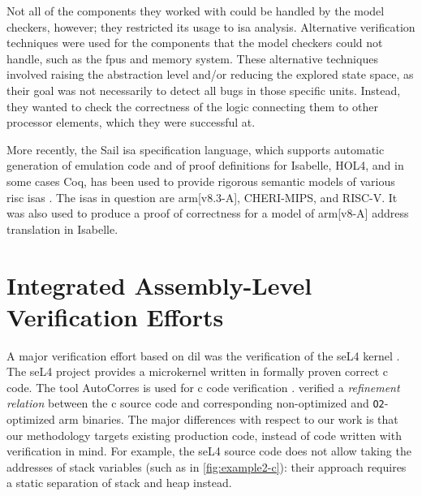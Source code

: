 Not all of the components they worked with could be handled by the model checkers,
however; they restricted its usage to \ac{isa} analysis.
Alternative verification techniques were used for the components that the model checkers
could not handle, such as the \acp{fpu} and memory system.
These alternative techniques involved raising the abstraction level
and/or reducing the explored state space,
as their goal was not necessarily to detect all bugs in those specific units.
Instead, they wanted to check the correctness of the logic connecting them
to other processor elements, which they were successful at.

More recently, the Sail \ac{isa} specification language,
which supports automatic generation of emulation code
and of proof definitions for Isabelle, HOL4, and in some cases Coq,
has been used to provide rigorous semantic models of various \ac{risc} \acp{isa}
\autocite{armstrong2018models,armstrong2019isa}.
The \acp{isa} in question are \gls{arm}[v8.3-A], CHERI-MIPS, and RISC-V.
It was also used to produce a proof of correctness for a model of
\gls{arm}[v8-A] address translation in Isabelle.

\section{Integrated Assembly-Level Verification Efforts}\label{se:integrated_assembly}
A major verification effort based on \acl{dil}
was the verification of the seL4 kernel \autocite{klein2009sel4,Klein_AEMSKH_14}.
The seL4 project provides a microkernel written in formally proven correct \gls{c} code.
The tool AutoCorres is used for \gls{c} code verification \autocite{greenaway2012bridging}.
\Textcite{sewell2013tvv} verified a \emph{refinement relation} between the \gls{c} source code
and corresponding non-optimized and \lstinline|O2|-optimized \gls{arm} binaries.
The major differences with respect to our work
is that our methodology targets existing production code,
instead of code written with verification in mind.
For example, the seL4 source code does not allow taking the addresses of stack variables
(such as in \cref{fig:example2-c}):
their approach requires a static separation of stack and heap instead.

